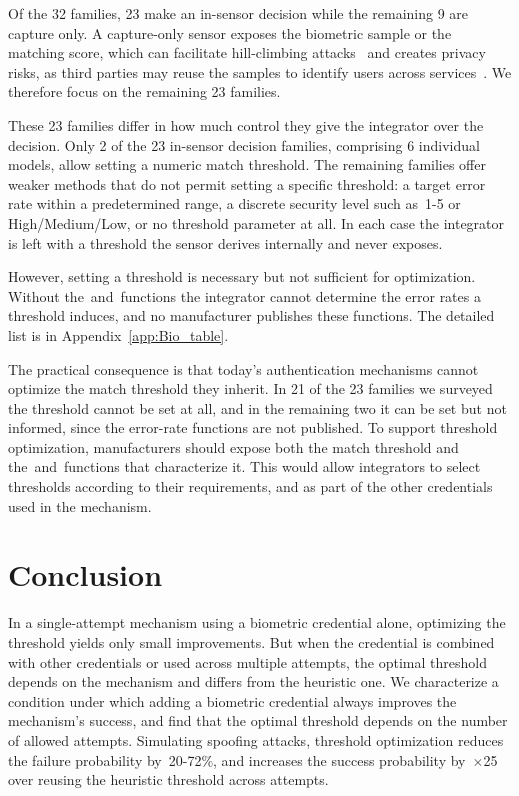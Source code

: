 \documentclass[conference,compsoc]{IEEEtran}
\begin{document}
Of the 32 families, 23 make an in-sensor decision while the remaining 9 are capture only.
A capture-only sensor exposes the biometric sample or the matching score, which can facilitate hill-climbing attacks~\cite{Bringer2018PrivateByDesign} and creates privacy risks, as third parties may reuse the samples to identify users across services~\cite{FIDOPrivacyPrinciples}.
We therefore focus on the remaining 23 families.

These 23 families differ in how much control they give the integrator over the decision.
Only 2 of the 23 in-sensor decision families, comprising 6 individual models, allow setting a numeric match threshold.
The remaining families offer weaker methods that do not permit setting a specific threshold: a target error rate within a predetermined range, a discrete security level such as~1-5 or High/Medium/Low, or no threshold parameter at all.
In each case the integrator is left with a threshold the sensor derives internally and never exposes.

However, setting a threshold is necessary but not sufficient for optimization. 
Without the~\FAR and~\FRR functions the integrator cannot determine the error rates a threshold induces, and no manufacturer publishes these functions.
The detailed list is in Appendix~\ref{app:Bio_table}.

The practical consequence is that today's authentication mechanisms cannot optimize the match threshold they inherit.
In 21 of the 23 families we surveyed the threshold cannot be set at all, and in the remaining two it can be set but not informed, since the error-rate functions are not published.
To support threshold optimization, manufacturers should expose both the match threshold and the~\FAR and~\FRR functions that characterize it.
This would allow integrators to select thresholds according to their requirements, and as part of the other credentials used in the mechanism.

\section{Conclusion}\label{sec:conclusion}
\noindent
In a single-attempt mechanism using a biometric credential alone, optimizing the threshold yields only small improvements. But when the credential is combined with other credentials or used across multiple attempts, the optimal threshold depends on the mechanism and differs from the heuristic one. We characterize a condition under which adding a biometric credential always improves the mechanism’s success, and find that the optimal threshold depends on the number of allowed attempts. Simulating spoofing attacks, threshold optimization reduces the failure probability by~20-72\%, and increases the success probability by~$\times$25 over reusing the heuristic threshold across attempts.
\end{document}
